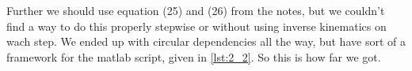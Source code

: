 \documentclass[a4paper]{scrartcl}
\begin{document}


Further we should use equation (25) and (26) from the notes, but we couldn't find a way to do this properly stepwise or without using inverse kinematics on wach step. We ended up with circular dependencies all the way, but have sort of a framework for the matlab script, given in \autoref{lst:2_2}. So this is how far we got.


\end{document}
